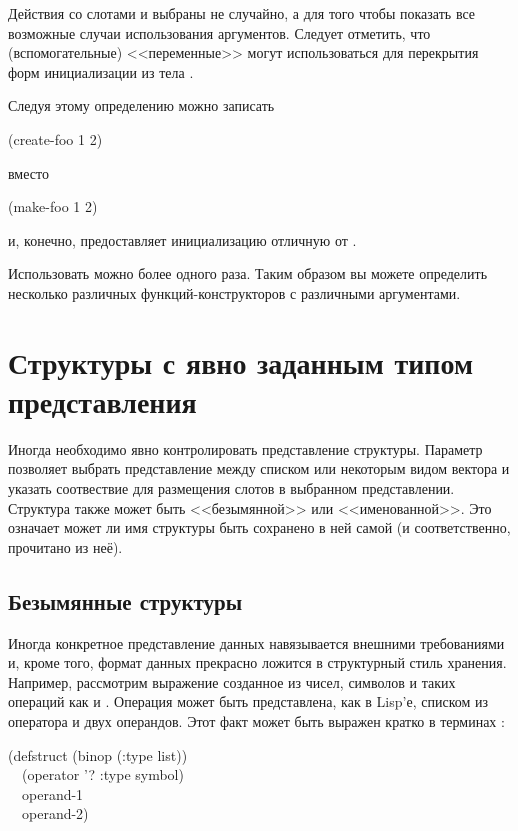 Действия со слотами  и  выбраны не случайно, а для того чтобы
показать все возможные случаи использования аргументов.
Следует отметить, что  (вспомогательные) <<переменные>> могут
использоваться для перекрытия форм инициализации из тела .

Следуя этому определению можно записать
\begin{lisp}
(create-foo 1 2)
\end{lisp}
вместо
\begin{lisp}
(make-foo  1  2)
\end{lisp}
и, конечно,  предоставляет инициализацию отличную от
.

Использовать  можно более одного раза. Таким образом вы можете
определить несколько различных функций-конструкторов с различными аргументами.

\section{Структуры с явно заданным типом представления}
\label{EXPLICIT-TYPE-STRUCTURES}

Иногда необходимо явно контролировать представление структуры. Параметр
 позволяет выбрать представление между списком или некоторым видом
вектора и указать соотвествие для размещения слотов в выбранном представлении.
Структура также может быть <<безымянной>> или <<именованной>>. Это означает
может ли имя структуры быть сохранено в ней самой (и соответственно, прочитано
из неё).

\subsection{Безымянные структуры}

Иногда конкретное представление данных навязывается внешними требованиями и,
кроме того, формат данных прекрасно ложится в структурный стиль хранения.
Например, рассмотрим выражение созданное из чисел, символов и таких операций как
\cdf{+} и \cdf{*}. Операция может быть представлена, как в Lisp'е, списком из
оператора и двух операндов. Этот факт может быть выражен кратко в терминах
:
\begin{lisp}
(defstruct (binop (:type list)) \\
~~(operator '? :type symbol) \\
~~operand-1 \\
~~operand-2)
\end{lisp}

